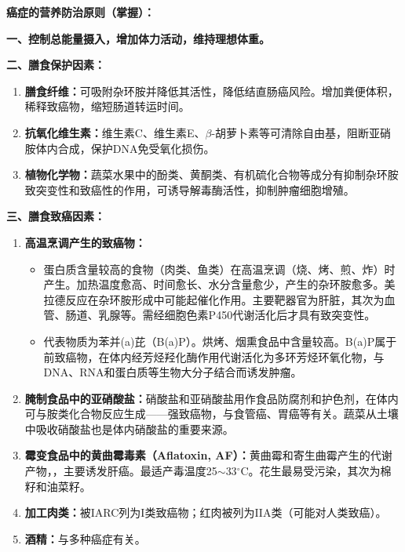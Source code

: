 \begin{keybox}
\textbf{癌症的营养防治原则（掌握）：}

\textbf{一、控制总能量摄入，增加体力活动，维持理想体重。}

\textbf{二、膳食保护因素：}
\begin{enumerate}[leftmargin=*]
    \item \textbf{膳食纤维：}可吸附杂环胺并降低其活性，降低结直肠癌风险。增加粪便体积，稀释致癌物，缩短肠道转运时间。
    \item \textbf{抗氧化维生素：}维生素C、维生素E、$\beta$-胡萝卜素等可清除自由基，阻断亚硝胺体内合成，保护DNA免受氧化损伤。
    \item \textbf{植物化学物：}蔬菜水果中的酚类、黄酮类、有机硫化合物等成分有抑制杂环胺致突变性和致癌性的作用，可诱导解毒酶活性，抑制肿瘤细胞增殖。
\end{enumerate}

\textbf{三、膳食致癌因素：}
\begin{enumerate}[leftmargin=*]
    \item \textbf{高温烹调产生的致癌物：}
    \begin{itemize}[leftmargin=*]
        \item {}蛋白质含量较高的食物（肉类、鱼类）在高温烹调（烧、烤、煎、炸）时产生。加热温度愈高、时间愈长、水分含量愈少，产生的杂环胺愈多。美拉德反应在杂环胺形成中可能起催化作用。主要靶器官为肝脏，其次为血管、肠道、乳腺等。需经细胞色素P450代谢活化后才具有致突变性。
        \item {}代表物质为苯并(a)芘（B(a)P）。烘烤、烟熏食品中含量较高。B(a)P属于前致癌物，在体内经芳烃羟化酶作用代谢活化为多环芳烃环氧化物，与DNA、RNA和蛋白质等生物大分子结合而诱发肿瘤。
    \end{itemize}
    \item \textbf{腌制食品中的亚硝酸盐：}硝酸盐和亚硝酸盐用作食品防腐剂和护色剂，在体内可与胺类化合物反应生成——强致癌物，与食管癌、胃癌等有关。蔬菜从土壤中吸收硝酸盐也是体内硝酸盐的重要来源。
    \item \textbf{霉变食品中的黄曲霉毒素（Aflatoxin, AF）：}黄曲霉和寄生曲霉产生的代谢产物，，主要诱发肝癌。最适产毒温度25$\sim$33$^\circ$C。花生最易受污染，其次为棉籽和油菜籽。
    \item \textbf{加工肉类：}被IARC列为I类致癌物；红肉被列为IIA类（可能对人类致癌）。
    \item \textbf{酒精：}与多种癌症有关。
\end{enumerate}
\end{keybox}

